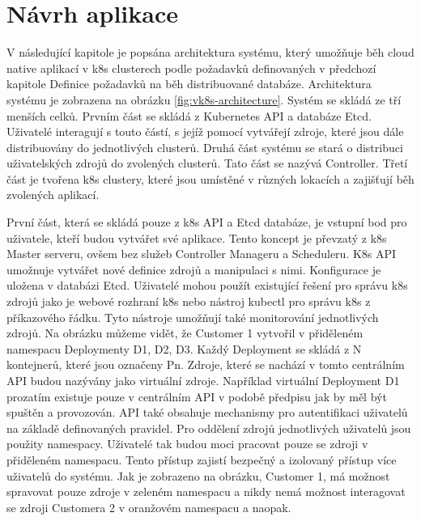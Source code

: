 \section{Návrh aplikace}
V následující kapitole je popsána architektura systému, který umožňuje běh cloud native aplikací v k8s clusterech podle požadavků definovaných v předchozí kapitole \linebreak Definice požadavků na běh distribuované databáze. Architektura systému je zobrazena na obrázku \ref{fig:vk8s-architecture}. Systém se skládá ze tří menších celků. Prvním část se skládá z Kubernetes API a databáze Etcd. Uživatelé interagují s touto částí, s jejíž pomocí vytvářejí zdroje, které jsou dále distribuovány do jednotlivých clusterů. Druhá část systému se stará o distribuci uživatelských zdrojů do zvolených clusterů. Tato část se nazývá Controller. Třetí část je tvořena k8s clustery, které jsou umístěné v různých lokacích a zajišťují běh zvolených aplikací.\par
První část, která se skládá pouze z k8s API a Etcd databáze, je vstupní bod pro uživatele, kteří budou vytvářet své aplikace. Tento koncept je převzatý z k8s Master serveru, ovšem bez služeb Controller Manageru a Scheduleru. K8s API umožnuje vytvářet nové definice zdrojů a manipulaci s nimi. Konfigurace je uložena v databázi Etcd. Uživatelé mohou použít existující řešení pro správu k8s zdrojů jako je webové rozhraní k8s nebo nástroj kubectl pro správu k8s z příkazového řádku. Tyto nástroje umožňují také monitorování jednotlivých zdrojů. Na obrázku můžeme vidět, že Customer 1 vytvořil v přiděleném namespacu Deploymenty D1, D2, D3. Každý Deployment se skládá z N kontejnerů, které jsou označeny Pn. Zdroje, které se nachází v tomto centrálním API budou nazývány jako virtuální zdroje. Například virtuální Deployment D1 prozatím existuje pouze v centrálním API v podobě předpisu jak by měl být spuštěn a provozován. API také obsahuje mechanismy pro autentifikaci uživatelů na základě definovaných pravidel. Pro oddělení zdrojů jednotlivých uživatelů jsou použity namespacy. Uživatelé tak budou moci pracovat pouze se zdroji v přiděleném namespacu. Tento přístup zajistí bezpečný a izolovaný přístup více uživatelů do systému. Jak je zobrazeno na obrázku, Customer 1, má možnost spravovat pouze zdroje v zeleném namespacu a nikdy nemá možnost interagovat se zdroji Customera 2 v oranžovém namespacu a naopak.\par
